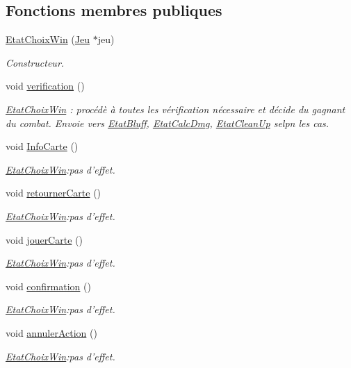 \subsection*{Fonctions membres publiques}
\begin{DoxyCompactItemize}
\item 
\hyperlink{class_etat_choix_win_a3b9cb41872f4cc11aa52cd22b62de7c3}{Etat\-Choix\-Win} (\hyperlink{class_jeu}{Jeu} $\ast$jeu)
\begin{DoxyCompactList}\small\item\em Constructeur. \end{DoxyCompactList}\item 
void \hyperlink{class_etat_choix_win_ae4b933e5eb219ad05263447db0d970e2}{verification} ()
\begin{DoxyCompactList}\small\item\em \hyperlink{class_etat_choix_win}{Etat\-Choix\-Win} \-: procédè à toutes les vérification nécessaire et décide du gagnant du combat. Envoie vers \hyperlink{class_etat_bluff}{Etat\-Bluff}, \hyperlink{class_etat_calc_dmg}{Etat\-Calc\-Dmg}, \hyperlink{class_etat_clean_up}{Etat\-Clean\-Up} selpn les cas. \end{DoxyCompactList}\item 
void \hyperlink{class_etat_choix_win_af5143e3b6e6c80633b48fcbc9fa52be2}{Info\-Carte} ()
\begin{DoxyCompactList}\small\item\em \hyperlink{class_etat_choix_win}{Etat\-Choix\-Win}\-:pas d'effet. \end{DoxyCompactList}\item 
void \hyperlink{class_etat_choix_win_a583e3a7b7d7e922a74a4609d31c277ee}{retourner\-Carte} ()
\begin{DoxyCompactList}\small\item\em \hyperlink{class_etat_choix_win}{Etat\-Choix\-Win}\-:pas d'effet. \end{DoxyCompactList}\item 
void \hyperlink{class_etat_choix_win_a32f02c55bfbf8b580dee3bd95ce1921e}{jouer\-Carte} ()
\begin{DoxyCompactList}\small\item\em \hyperlink{class_etat_choix_win}{Etat\-Choix\-Win}\-:pas d'effet. \end{DoxyCompactList}\item 
void \hyperlink{class_etat_choix_win_aef8d0abe059050e7a7e3e598c87de992}{confirmation} ()
\begin{DoxyCompactList}\small\item\em \hyperlink{class_etat_choix_win}{Etat\-Choix\-Win}\-:pas d'effet. \end{DoxyCompactList}\item 
void \hyperlink{class_etat_choix_win_ae321052d630a6a679f6347c36f580ea7}{annuler\-Action} ()
\begin{DoxyCompactList}\small\item\em \hyperlink{class_etat_choix_win}{Etat\-Choix\-Win}\-:pas d'effet. \end{DoxyCompactList}\end{DoxyCompactItemize}


